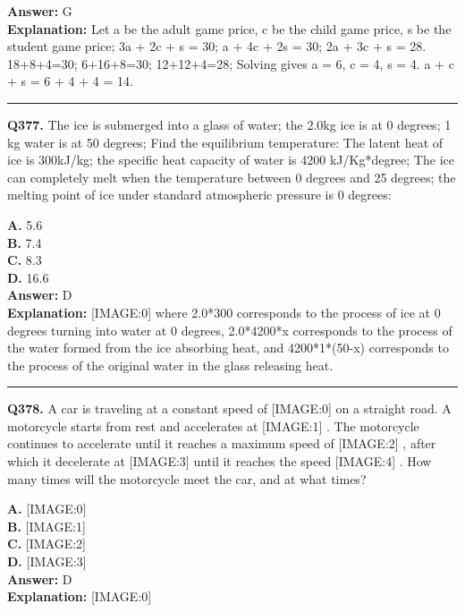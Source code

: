 \documentclass[12pt]{article}
\begin{document}
\textbf{Answer:} G \\
\textbf{Explanation:} Let a be the adult game price, c be the child game price, s be the student game price;
3a + 2c + s = 30; a + 4c + 2s = 30; 2a + 3c + s = 28.
18+8+4=30; 6+16+8=30; 12+12+4=28;
Solving gives a = 6, c = 4, s = 4.
a + c + s = 6 + 4 + 4 = 14.

\hrule
\vspace{1em}


\noindent
\textbf{Q377.} The ice is submerged into a glass of water; the 2.0kg ice is at 0 degrees; 1 kg water is at 50 degrees; Find the equilibrium temperature: The latent heat of ice is 300kJ/kg; the specific heat capacity of water is 4200 kJ/Kg*degree; The ice can completely melt when the temperature between 0 degrees and 25 degrees; the melting point of ice under standard atmospheric pressure is 0 degrees:



\textbf{A.} 5.6 \\
\textbf{B.} 7.4 \\
\textbf{C.} 8.3 \\
\textbf{D.} 16.6 \\

\textbf{Answer:} D \\
\textbf{Explanation:} [IMAGE:0]
where 2.0*300
corresponds to the process of ice at 0 degrees turning into water at 0 degrees, 2.0*4200*x
corresponds to the process of the water formed from the ice absorbing heat, and 4200*1*(50-x)
corresponds to the process of the original water in the glass releasing heat.

\hrule
\vspace{1em}


\noindent
\textbf{Q378.} A car is traveling at a constant speed of
[IMAGE:0]
on a straight road. A motorcycle starts from rest and accelerates at
[IMAGE:1]
. The motorcycle continues to accelerate until it reaches a maximum speed of
[IMAGE:2]
, after which it decelerate at
[IMAGE:3]
until it reaches the speed
[IMAGE:4]
. How many times will the motorcycle meet the car, and at what times?



\textbf{A.} [IMAGE:0] \\
\textbf{B.} [IMAGE:1] \\
\textbf{C.} [IMAGE:2] \\
\textbf{D.} [IMAGE:3] \\

\textbf{Answer:} D \\
\textbf{Explanation:} [IMAGE:0]
\end{document}
